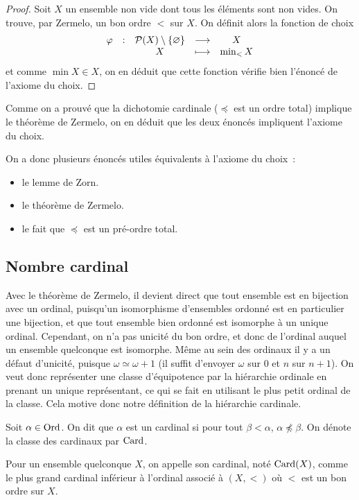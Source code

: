 \begin{proof}
  Soit $X$ un ensemble non vide dont tous les éléments sont non vides.
  On trouve, par Zermelo, un bon ordre $<$ sur $X$. On définit alors la
  fonction de choix
  \[\begin{array}{ccccc}
  \varphi & : & \mathcal{P}(X)\setminus\{\varnothing\} & \longrightarrow
  & X\\
  & & X &\longmapsto & \min_{<} X
  \end{array}\]
  et comme $\min X\in X$, on en déduit que cette fonction vérifie bien l'énoncé
  de l'axiome du choix.
\end{proof}

Comme on a prouvé que la dichotomie cardinale ($\preceq$ est un ordre total)
implique le théorème de Zermelo, on en déduit que les deux énoncés impliquent
l'axiome du choix.

On a donc plusieurs énoncés utiles équivalents à l'axiome du choix~:
\begin{itemize}
\item le lemme de Zorn.
\item le théorème de Zermelo.
\item le fait que $\preceq$ est un pré-ordre total.
\end{itemize}

\subsection{Nombre cardinal}

Avec le théorème de Zermelo, il devient direct que tout ensemble est en
bijection avec un ordinal, puisqu'un isomorphisme d'ensembles ordonné est en
particulier une bijection, et que tout ensemble bien ordonné est isomorphe à
un unique ordinal. Cependant, on n'a pas unicité du bon ordre, et donc de
l'ordinal auquel un ensemble quelconque est isomorphe. Même au sein des ordinaux
il y a un défaut d'unicité, puisque $\omega \simeq \omega + 1$ (il suffit
d'envoyer $\omega$ sur $0$ et $n$ sur $n + 1$). On veut donc représenter une
classe d'équipotence par la hiérarchie ordinale en prenant un unique
représentant, ce qui se fait en utilisant le plus petit ordinal de la classe.
Cela motive donc notre définition de la hiérarchie cardinale.

\begin{definition}[Cardinal]
  Soit $\alpha \in \operatorname{Ord}$. On dit que $\alpha$ est un cardinal si pour tout
  $\beta < \alpha$, $\alpha\not\preceq \beta$. On dénote la classe des cardinaux
  par $\operatorname{Card}$.

  Pour un ensemble quelconque $X$, on appelle son cardinal, noté $\operatorname{Card}(X)$,
  comme le plus grand cardinal inférieur à l'ordinal associé à $(X,<)$ où $<$
  est un bon ordre sur $X$.
\end{definition}

